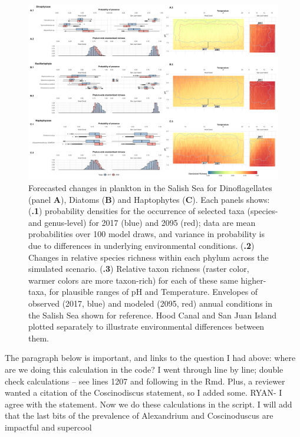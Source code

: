 \documentclass[11pt]{article}
\begin{document}
\begin{linenumbers}
 \begin{figure}
 \centering
 \includegraphics[width=1\linewidth]{Figures_for_MS/Top_fig3_2020-09-03.Other.sel.png}
\caption{\footnotesize{Forecasted changes in plankton in the Salish Sea {\color{red} for Dinoflagellates (panel \textbf{A}), Diatoms (\textbf{B}) and Haptophytes (\textbf{C}). Each panels shows:  (\textbf{.1}) probability densities for the occurrence of selected taxa (species- and genus-level) for 2017 (blue) and 2095 (red); data are mean probabilities over 100 model draws, and variance in probability is due to differences in underlying environmental conditions.  (\textbf{.2}) Changes in relative species richness within each phylum across the simulated scenario. (\textbf{.3}) Relative taxon richness (raster color, warmer colors are more taxon-rich) for each of these same higher-taxa, for plausible ranges of pH and Temperature. Envelopes of observed (2017, blue) and modeled (2095, red) annual conditions in the Salish Sea shown for reference. Hood Canal and San Juan Island plotted separately to illustrate environmental differences between them.}}}

\label{fig:Fig3}
 \end{figure}
 
 
{\color{blue} The paragraph below is important, and links to the question I had above: where are we doing this calculation in the code? I went through line by line; double check calculations -- see lines 1207 and following in the Rmd. Plus, a reviewer wanted a citation of the Coscinodiscus statement, so I added some. RYAN- I agree with the statement. Now we do these calculations in the script. I will add that the last bits of the prevalence of Alexandrium and Coscinoduscus are impactful and supercool} 


\end{linenumbers}
\end{document}
